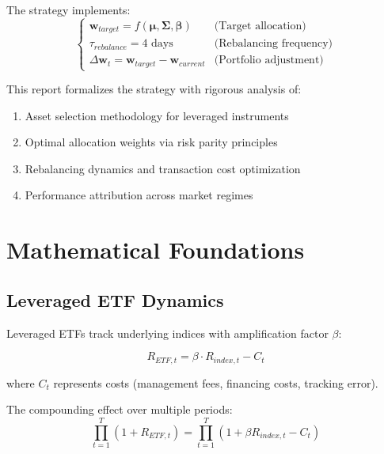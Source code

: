 \documentclass[11pt]{IEEEtran}
\begin{document}
The strategy implements:
\begin{equation*}
\begin{cases}
\mathbf{w}_{target} = f(\boldsymbol{\mu}, \boldsymbol{\Sigma}, \boldsymbol{\beta}) & \text{(Target allocation)} \\
\tau_{rebalance} = 4 \text{ days} & \text{(Rebalancing frequency)} \\
\Delta \mathbf{w}_t = \mathbf{w}_{target} - \mathbf{w}_{current} & \text{(Portfolio adjustment)}
\end{cases}
\end{equation*}

\begin{multicols}{2}

This report formalizes the strategy with rigorous analysis of:
\begin{enumerate}
    \item Asset selection methodology for leveraged instruments
    \item Optimal allocation weights via risk parity principles
    \item Rebalancing dynamics and transaction cost optimization
    \item Performance attribution across market regimes
\end{enumerate}

\section{Mathematical Foundations}

\subsection{Leveraged ETF Dynamics}

Leveraged ETFs track underlying indices with amplification factor $\beta$:

\end{multicols}

\begin{equation}
R_{ETF,t} = \beta \cdot R_{index,t} - C_t
\end{equation}

where $C_t$ represents costs (management fees, financing costs, tracking error).

The compounding effect over multiple periods:
\begin{equation}
\prod_{t=1}^T (1 + R_{ETF,t}) = \prod_{t=1}^T (1 + \beta R_{index,t} - C_t)
\end{equation}
\end{document}
